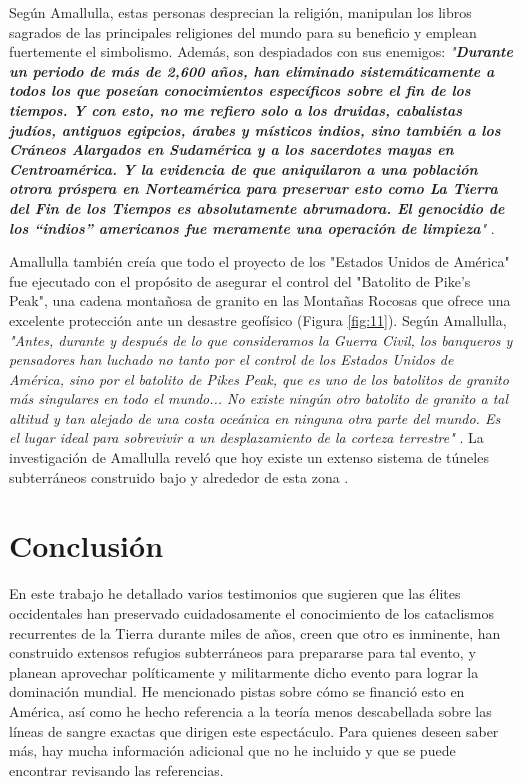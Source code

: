 \documentclass[10pt,twocolumn,letterpaper]{article}
\begin{document}
Según Amallulla, estas personas desprecian la religión, manipulan los libros sagrados de las principales religiones del mundo para su beneficio y emplean fuertemente el simbolismo. Además, son despiadados con sus enemigos: \textit{"\textbf{Durante un periodo de más de 2,600 años, han eliminado sistemáticamente a todos los que poseían conocimientos específicos sobre el fin de los tiempos. Y con esto, no me refiero solo a los druidas, cabalistas judíos, antiguos egipcios, árabes y místicos indios, sino también a los Cráneos Alargados en Sudamérica y a los sacerdotes mayas en Centroamérica. Y la evidencia de que aniquilaron a una población otrora próspera en Norteamérica para preservar esto como La Tierra del Fin de los Tiempos es absolutamente abrumadora. El genocidio de los “indios” americanos fue meramente una operación de limpieza}"} \cite{33,34}.

Amallulla también creía que todo el proyecto de los "Estados Unidos de América" fue ejecutado con el propósito de asegurar el control del "Batolito de Pike's Peak", una cadena montañosa de granito en las Montañas Rocosas que ofrece una excelente protección ante un desastre geofísico (Figura \ref{fig:11}). Según Amallulla, \textit{"Antes, durante y después de lo que consideramos la Guerra Civil, los banqueros y pensadores han luchado no tanto por el control de los Estados Unidos de América, sino por el batolito de Pikes Peak, que es uno de los batolitos de granito más singulares en todo el mundo... No existe ningún otro batolito de granito a tal altitud y tan alejado de una costa oceánica en ninguna otra parte del mundo. Es el lugar ideal para sobrevivir a un desplazamiento de la corteza terrestre"} \cite{33,34}. La investigación de Amallulla reveló que hoy existe un extenso sistema de túneles subterráneos construido bajo y alrededor de esta zona \cite{36}.

\section{Conclusión}

En este trabajo he detallado varios testimonios que sugieren que las élites occidentales han preservado cuidadosamente el conocimiento de los cataclismos recurrentes de la Tierra durante miles de años, creen que otro es inminente, han construido extensos refugios subterráneos para prepararse para tal evento, y planean aprovechar políticamente y militarmente dicho evento para lograr la dominación mundial. He mencionado pistas sobre cómo se financió esto en América, así como he hecho referencia a la teoría menos descabellada sobre las líneas de sangre exactas que dirigen este espectáculo. Para quienes deseen saber más, hay mucha información adicional que no he incluido y que se puede encontrar revisando las referencias.
\end{document}
